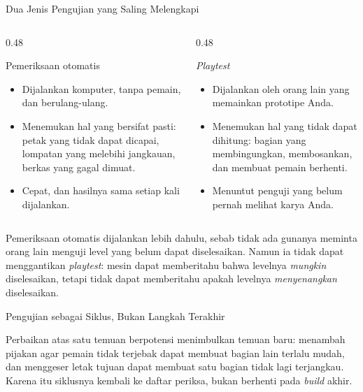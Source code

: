 \documentclass[aspectratio=169,10pt]{beamer}
\begin{document}
\begin{frame}{Dua Jenis Pengujian yang Saling Melengkapi}
\begin{columns}[T,onlytextwidth]
  \begin{column}{0.48\textwidth}
    \begin{block}{Pemeriksaan otomatis}
      \begin{itemize}
        \item Dijalankan komputer, tanpa pemain, dan berulang-ulang.
        \item Menemukan hal yang bersifat pasti: petak yang tidak dapat
              dicapai, lompatan yang melebihi jangkauan, berkas yang gagal
              dimuat.
        \item Cepat, dan hasilnya sama setiap kali dijalankan.
      \end{itemize}
    \end{block}
  \end{column}
  \begin{column}{0.48\textwidth}
    \begin{exampleblock}{\emph{Playtest}}
      \begin{itemize}
        \item Dijalankan oleh orang lain yang memainkan prototipe Anda.
        \item Menemukan hal yang tidak dapat dihitung: bagian yang
              membingungkan, membosankan, dan membuat pemain berhenti.
        \item Menuntut penguji yang belum pernah melihat karya Anda.
      \end{itemize}
    \end{exampleblock}
  \end{column}
\end{columns}
\vspace{0.16cm}
\begin{kotak}
Pemeriksaan otomatis dijalankan lebih dahulu, sebab tidak ada gunanya meminta
orang lain menguji level yang belum dapat diselesaikan. Namun ia tidak dapat
menggantikan \emph{playtest}: mesin dapat memberitahu bahwa levelnya
\emph{mungkin} diselesaikan, tetapi tidak dapat memberitahu apakah levelnya
\emph{menyenangkan} diselesaikan.
\end{kotak}
\end{frame}

\begin{frame}{Pengujian sebagai Siklus, Bukan Langkah Terakhir}
\centering
{}\par
\vspace{0.12cm}
\begin{kotak}
Perbaikan atas satu temuan berpotensi menimbulkan temuan baru: menambah pijakan
agar pemain tidak terjebak dapat membuat bagian lain terlalu mudah, dan
menggeser letak tujuan dapat membuat satu bagian tidak lagi terjangkau. Karena
itu siklusnya kembali ke daftar periksa, bukan berhenti pada \emph{build} akhir.
\end{kotak}
\end{frame}
\end{document}
